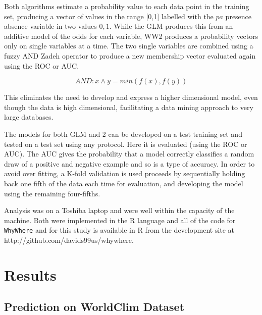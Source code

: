 \documentclass[10pt]{article}
\begin{document}
Both algorithms estimate a probability value to each data point in the training set, producing  a vector of values in the range [0,1] labelled with the $pa$ presence absence variable in two values ${0,1}$.  While the GLM produces this from an additive model of the odds for each variable, WW2 produces a probability vectors only on single variables at a time.  The two single variables are combined using a fuzzy AND Zadeh operator \cite{Zadeh1965} to produce a new membership vector evaluated again using the ROC or AUC. 

\begin{equation}
AND: x \land y = min(f(x),f(y))
\end{equation}

This eliminates the need to develop and express a higher dimensional model, even though the data is high dimensional, facilitating a data mining approach to very large databases.  

The models for both GLM and 2 can be developed on a test training set and tested on a test set using any protocol.  Here it is  evaluated (using the ROC or AUC). The AUC gives the probability that a model correctly classifies a random draw of a positive and negative example and so is a type of accuracy. In order to avoid over fitting, a K-fold validation is used proceeds by sequentially holding back one fifth of the data each time for evaluation, and developing the model using the remaining four-fifths.   

Analysis was on a Toshiba laptop and were well within the capacity of the machine.  Both were implemented in the R language and all of the code for \texttt{WhyWhere} and for this study is available in R from the development site at http://github.com/davids99us/whywhere.  

\section{Results}

\subsection{Prediction on WorldClim Dataset} 
\end{document}
